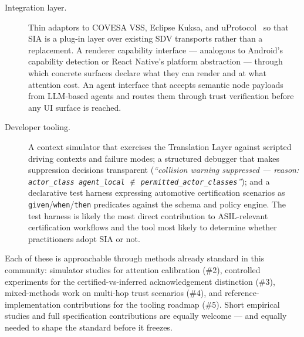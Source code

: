 \documentclass[manuscript,screen,review,anonymous]{acmart}
\begin{document}
\begin{enumerate}
\begin{description}
      \item[Integration layer.]
        Thin adaptors to COVESA VSS, Eclipse Kuksa, and
        uProtocol~\cite{eclipsesdv} so that SIA is a plug-in layer over
        existing SDV transports rather than a replacement. A renderer capability
        interface --- analogous to Android's capability detection or React
        Native's platform abstraction --- through which concrete surfaces
        declare what they can render and at what attention cost. An agent
        interface that accepts semantic node payloads from LLM-based agents and
        routes them through trust verification before any UI surface is reached.

      \item[Developer tooling.]
        A context simulator that exercises the Translation Layer against
        scripted driving contexts and failure modes; a structured debugger that
        makes suppression decisions transparent (\emph{``collision warning
        suppressed --- reason: \texttt{actor\_class agent\_local}
        $\notin$ \texttt{permitted\_actor\_classes}''});
        and a declarative test harness expressing automotive certification
        scenarios as \texttt{given}/\texttt{when}/\texttt{then} predicates
        against the schema and policy engine. The test harness is likely the
        most direct contribution to ASIL-relevant certification workflows and
        the tool most likely to determine whether practitioners adopt SIA or
        not.
    \end{description}
\end{enumerate}

Each of these is approachable through methods already standard in this
community: simulator studies for attention calibration (\#2), controlled
experiments for the certified-vs-inferred acknowledgement distinction (\#3),
mixed-methods work on multi-hop trust scenarios (\#4), and
reference-implementation contributions for the tooling roadmap (\#5). Short
empirical studies and full specification contributions are equally welcome ---
and equally needed to shape the standard before it freezes.



\end{document}
